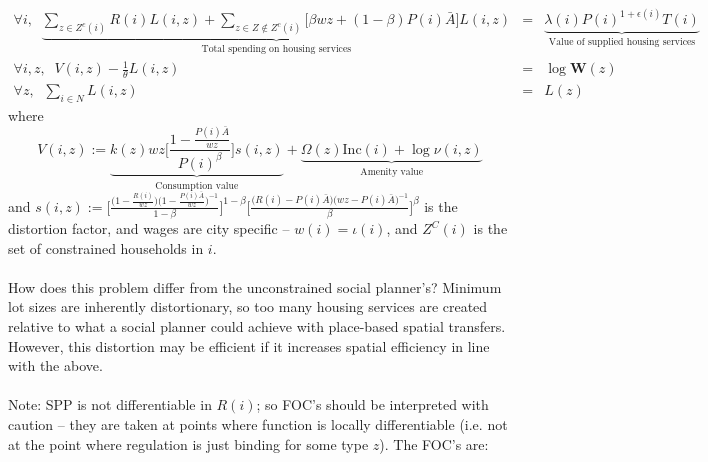 \documentclass[11pt]{article}
\begin{document}
	\begin{eqnarray}
		\forall i, \; \; \underbrace{\sum_{z \in Z^{c}(i)}R(i)L(i, z) + \sum_{z \in Z\notin Z^{c}(i)}\bigg[\beta wz + (1 - \beta)P(i)\bar{A}\bigg]L(i, z)}_{\text{Total spending on housing services}} & = & \underbrace{\lambda(i)P(i)^{1 + \epsilon(i)}T(i)}_{\text{Value of supplied housing services}} \\
		\forall i, z,	\; \; V(i, z) - \frac{1}{\theta}L(i, z)	 & = & \log \boldsymbol{W}(z)	\\
		\forall z,	\; \;\sum_{i \in N}L(i, z) & = & L(z)	
	\end{eqnarray}
	where
	\begin{equation*}
		V(i, z) := \underbrace{k(z)wz\bigg[\frac{1-\frac{P(i)\bar{A}}{wz}}{P(i)^{\beta}}\bigg]s(i, z)}_{\text{Consumption value}} + \underbrace{\Omega(z)\text{Inc}(i) + \log\nu(i, z)}_{\text{Amenity value}}
	\end{equation*}
	and $s(i, z) := \bigg[\frac{\big(1 - \frac{R(i)}{wz}\big)\big(1 - \frac{P(i)\bar{A}}{wz}\big)^{-1}}{1-\beta}\bigg]^{1-\beta}\bigg[\frac{\big(R(i) - P(i)\bar{A}\big)\big(wz - P(i)\bar{A}\big)^{-1}}{\beta}\bigg]^{\beta}$ is the distortion factor, and wages are city specific -- $w(i) = \iota(i)$, and $Z^{C}(i)$ is the set of constrained households in $i$. 
	
	\paragraph*{}
	 How does this problem differ from the unconstrained social planner's? Minimum lot sizes are inherently distortionary, so too many housing services are created relative to what a social planner could achieve with place-based spatial transfers. However, this distortion may be efficient if it increases spatial efficiency in line with the above.
	 
	 \paragraph*{}
	 Note: SPP is not differentiable in $R(i)$; so FOC's should be interpreted with caution -- they are taken at points where function is locally differentiable (i.e. not at the point where regulation is just binding for some type $z$). The FOC's are: 
	 
\end{document}
